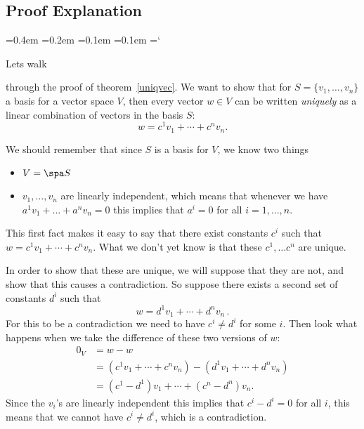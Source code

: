 
\subsection*{Proof Explanation}

{\ttfamily
{}\font=0.4em
\font=0.2em
\font=0.1em
\font=0.1em
\hyphenchar\font=`\-


\hypertarget{basis_and_dimension_thm}{Lets walk } through the proof of theorem~\ref{uniqvec}. We want to show that for $S=\{v_1, \ldots, v_n \}$ a basis for a vector space $V$, then every vector $w \in V$ can be written \emph{uniquely} as a linear combination of vectors in the basis $S$:
\[
w=c^1v_1+\cdots + c^nv_n.
\]

We should remember that since $S$ is a basis for $V$, we know two things
\begin{itemize}
\item $V = \spa S$
\item $ v_1, \ldots , v_n$ are linearly independent, which means that whenever we have 
$
a^1v_1+ \ldots + a^n v_n = 0
$
this implies that $a^i =0$ for all $i=1, \ldots, n$.
\end{itemize}
This first fact makes it easy to say that there exist constants $c^i$ such that $w=c^1v_1+\cdots + c^nv_n$. What we don't yet know is that these $c^1, \ldots c^n$ are unique.

 In order to show that these are unique, we will suppose that they are not, and show that this causes a contradiction. So suppose there exists a second set of constants $d^i$ such that 
\[w=d^1v_1+\cdots + d^nv_n\, .\] 
For this to be a contradiction we need to have $c^i \neq d^i$ for some $i$. Then look what happens when we take the difference of these two versions of $w$:
\begin{align*}
0_V&=w-w\\
&=(c^1v_1+\cdots + c^nv_n)-(d^1v_1+\cdots + d^nv_n )\\
&=(c^1-d^1)v_1+\cdots + (c^n-d^n)v_n.
\end{align*}
Since the $v_i$'s are linearly independent this implies that $c^i - d^i = 0$ for all $i$, this means that we cannot have $c^i \neq d^i$, which is a contradiction.



} %

